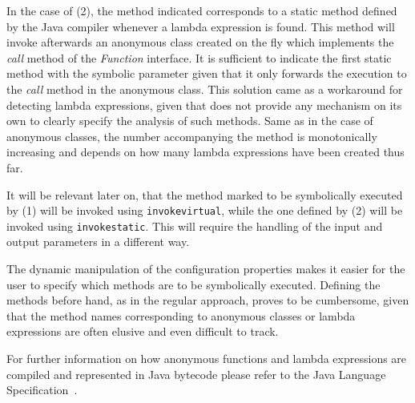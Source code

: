 In the case of (2), the method indicated corresponds to a static method defined by the Java compiler whenever a lambda expression is found. This method will invoke afterwards an anonymous class created on the fly which implements the \textit{call} method of the \textit{Function} interface. It is sufficient to indicate the first static method with the symbolic parameter given that it only forwards the execution to the \textit{call} method in the anonymous class. This solution came as a workaround for detecting lambda expressions, given that \spf does not provide any mechanism on its own to clearly specify the analysis of such methods. Same as in the case of anonymous classes, the number accompanying the method is monotonically increasing and depends on how many lambda expressions have been created thus far.

It will be relevant later on, that the method marked to be symbolically executed by (1) will be invoked using \texttt{invokevirtual}, while the one defined by (2) will be invoked using \texttt{invokestatic}. This will require the handling of the input and output parameters in a different way.

The dynamic manipulation of the configuration properties makes it easier for the user to specify which methods are to be symbolically executed. Defining the methods before hand, as in the regular \spf approach, proves to be cumbersome, given that the method names corresponding to anonymous classes or lambda expressions are often elusive and even difficult to track.

For further information on how anonymous functions and lambda expressions are compiled and represented in Java bytecode please refer to the Java Language Specification~\cite{Gosling2014}.


